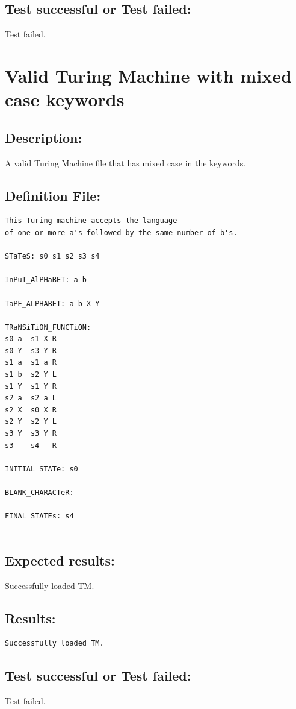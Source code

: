 \documentclass{report}
\begin{document}
\section{Test successful or Test failed:} Test failed.

\pagebreak


\chapter{Valid Turing Machine with mixed case keywords}
     
\section{Description:} A valid Turing Machine file that has mixed case in the keywords.

\section{Definition File: }
\begin{verbatim}
This Turing machine accepts the language 
of one or more a's followed by the same number of b's.

STaTeS: s0 s1 s2 s3 s4
	
InPuT_AlPHaBET: a b

TaPE_ALPHABET: a b X Y -

TRaNSiTiON_FUNCTiON:
s0 a  s1 X R
s0 Y  s3 Y R
s1 a  s1 a R
s1 b  s2 Y L
s1 Y  s1 Y R
s2 a  s2 a L
s2 X  s0 X R
s2 Y  s2 Y L
s3 Y  s3 Y R
s3 -  s4 - R

INITIAL_STATe: s0

BLANK_CHARACTeR: -

FINAL_STATEs: s4


\end{verbatim}
\section{Expected results:} Successfully loaded TM.
\section{Results:} 
\begin{verbatim}
Successfully loaded TM.
\end{verbatim}
\section{Test successful or Test failed:} Test failed.
\end{document}
